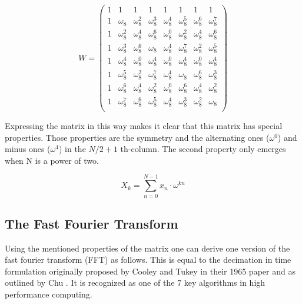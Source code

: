 \documentclass[english,11pt,a4paper,table]{article} %
\begin{document}
\begin{equation}
	W = \begin{pmatrix}1&1&1&1&1&1&1&1\\
		1&\omega_{8}&\omega_{8}^{2}&\omega_{8}^{3}&\omega_{8}^{4}&\omega_{8}^{5}&\omega_{8}^{6}&\omega_{8}^{7}\\
		1&\omega_{8}^{2}&\omega_{8}^{4}&\omega_{8}^{6}&\omega_{8}^{0}&\omega_{8}^{2}&\omega_{8}^{4}&\omega_{8}^{6}\\
		1&\omega_{8}^{3}&\omega_{8}^{6}&\omega_{8}&\omega_{8}^{4}&\omega_{8}^{7}&\omega_{8}^{2}&\omega_{8}^{5}\\
		1&\omega_{8}^{4}&\omega_{8}^{0}&\omega_{8}^{4}&\omega_{8}^{0}&\omega_{8}^{4}&\omega_{8}^{0}&\omega_{8}^{4}\\
		1&\omega_{8}^{5}&\omega_{8}^{2}&\omega_{8}^{7}&\omega_{8}^{4}&\omega_{8}&\omega_{8}^{6}&\omega_{8}^{3}\\
		1&\omega_{8}^{6}&\omega_{8}^{4}&\omega_{8}^{2}&\omega_{8}^{0}&\omega_{8}^{6}&\omega_{8}^{4}&\omega_{8}^{2}\\
		1&\omega_{8}^{7}&\omega_{8}^{6}&\omega_{8}^{5}&\omega_{8}^{4}&\omega_{8}^{3}&\omega_{8}^{2}&\omega_{8}\\
		\end{pmatrix}
\end{equation}

Expressing the matrix in this way makes it clear that this matrix has special properties.
Those properties are the symmetry and the alternating ones ($\omega^0$) and minus ones ($\omega^4$) in the $N/2+1$ th-column.
The second property only emerges when N is a power of two.

\begin{equation}
	\label{eq:dft-simplified}
	X_k = \sum_{n=0}^{N-1} x_n \cdot \omega^{kn}
\end{equation}

\subsection*{The Fast Fourier Transform}

Using the mentioned properties of the matrix one can derive one version of the fast fourier transform (FFT) as follows.
This is equal to the decimation in time formulation originally proposed by Cooley and Tukey in their 1965 paper \cite{cooley1965algorithm} and as outlined by Chu \cite{ChuEleanor2000ItFb}. 
It is recognized as one of the 7 key algorithms in high performance computing. \cite{10.1145/1562764.1562783}
\end{document}
